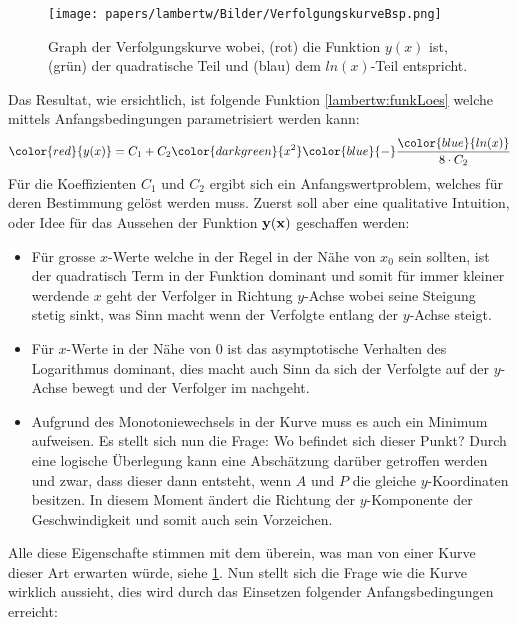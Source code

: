 \begin{figure}
	\centering
	\texttt{[image: papers/lambertw/Bilder/VerfolgungskurveBsp.png]}
	\caption[Graph der Verfolgungskurve]{Graph der Verfolgungskurve wobei, ({\color{red}rot}) die Funktion \ensuremath{y(x)} ist, ({\color{darkgreen}grün}) der quadratische Teil und ({\color{blue}blau}) dem \ensuremath{ln(x)}-Teil entspricht.
	\label{lambertw:BildFunkLoes}
	}
\end{figure}

Das Resultat, wie ersichtlich, ist folgende Funktion \eqref{lambertw:funkLoes} welche mittels Anfangsbedingungen parametrisiert werden kann: 
\begin{equation}
	{\color{red}{y(x)}}
	=
	C_1 + C_2 {\color{darkgreen}{x^2}} {\color{blue}{-}} \frac{\color{blue}{ln(x)}}{8 \cdot C_2}
	\label{lambertw:funkLoes}
\end{equation}
Für die Koeffizienten \(C_1\) und \(C_2\) ergibt sich ein Anfangswertproblem, welches für deren Bestimmung gelöst werden muss. Zuerst soll aber eine qualitative Intuition, oder Idee für das Aussehen der Funktion \(\bf{y(x)}\) geschaffen werden:
\begin{itemize}
	\item
	Für grosse \(x\)-Werte welche in der Regel in der Nähe von \(x_0\) sein sollten, ist der quadratisch Term in der Funktion dominant und somit für immer kleiner werdende \(x\) geht der Verfolger in Richtung \(y\)-Achse wobei seine Steigung stetig sinkt, was Sinn macht wenn der Verfolgte entlang der \(y\)-Achse steigt.
	\item
	Für \(x\)-Werte in der Nähe von \(0\) ist das asymptotische Verhalten des Logarithmus dominant, dies macht auch Sinn da sich der Verfolgte auf der \(y\)-Achse bewegt und der Verfolger im nachgeht.
	\item
	Aufgrund des Monotoniewechsels in der Kurve muss es auch ein Minimum aufweisen. Es stellt sich nun die Frage: Wo befindet sich dieser Punkt? Durch eine logische Überlegung kann eine Abschätzung darüber getroffen werden und zwar, dass dieser dann entsteht, wenn \(A\) und \(P\) die gleiche \(y\)-Koordinaten besitzen. In diesem Moment ändert die Richtung der \(y\)-Komponente der Geschwindigkeit und somit auch sein Vorzeichen.
\end{itemize}
Alle diese Eigenschafte stimmen mit dem überein, was man von einer Kurve dieser Art erwarten würde, siehe \ref{lambertw:BildFunkLoes}. Nun stellt sich die Frage wie die Kurve wirklich aussieht, dies wird durch das Einsetzen folgender Anfangsbedingungen erreicht:
